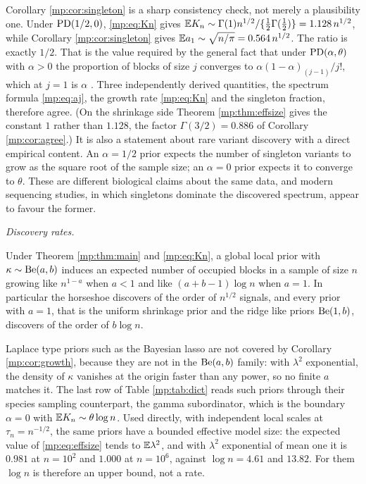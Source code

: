 Corollary \ref{mp:cor:singleton} is a sharp consistency check, not merely a plausibility one.
Under $\mathrm{PD}(1/2,0)$, \eqref{mp:eq:Kn} gives $\mathbb{E} K_n\sim\Gamma(1)n^{1/2}/\{\tfrac12\Gamma(\tfrac12)\}
=1.128\,n^{1/2}$, while Corollary \ref{mp:cor:singleton} gives
$\mathbb{E} a_1\sim\sqrt{n/\pi}=0.564\,n^{1/2}$. The ratio is exactly $1/2$. That is the value
required by the general fact that under $\mathrm{PD}(\alpha,\theta)$ with $\alpha>0$ the proportion of
blocks of size $j$ converges to $\alpha(1-\alpha)_{(j-1)}/j!$, which at $j=1$ is $\alpha$
\citep{mp:pitman2006}. Three independently derived quantities, the spectrum formula
\eqref{mp:eq:aj}, the growth rate \eqref{mp:eq:Kn} and the singleton fraction, therefore agree.
(On the shrinkage side Theorem \ref{mp:thm:effsize} gives the constant $1$ rather than $1.128$,
the factor $\Gamma(3/2)=0.886$ of Corollary \ref{mp:cor:agree}.) It is also a statement about rare variant discovery with a direct
empirical content. An $\alpha=1/2$ prior expects the number of singleton variants to grow
as the square root of the sample size; an $\alpha=0$ prior expects it to converge to
$\theta$. These are different biological claims about the same data, and modern sequencing
studies, in which singletons dominate the discovered spectrum, appear to favour the former.

\medskip
\noindent\emph{Discovery rates.}

\begin{corollary}
\label{mp:cor:growth}
Under Theorem \ref{mp:thm:main} and \eqref{mp:eq:Kn}, a global local prior with
$\kappa\sim\mathrm{Be}(a,b)$ induces an expected number of occupied blocks in a sample of size $n$
growing like $n^{1-a}$ when $a<1$ and like $(a+b-1)\log n$ when $a=1$. In particular the
horseshoe discovers of the order of $n^{1/2}$ signals, and every prior with $a=1$, that is
the uniform shrinkage prior and the ridge like priors $\mathrm{Be}(1,b)$, discovers of the order of
$b\log n$.
\end{corollary}

Laplace type priors such as the Bayesian lasso are not covered by Corollary
\ref{mp:cor:growth}, because they are not in the $\mathrm{Be}(a,b)$ family: with $\lambda^2$
exponential, the density of $\kappa$ vanishes at the origin faster than any power, so no
finite $a$ matches it. The last row of Table \ref{mp:tab:dict} reads such priors through
their species sampling counterpart, the gamma subordinator, which is the boundary
$\alpha=0$ with $\mathbb{E} K_n\sim\theta\log n$. Used directly, with independent local scales at
$\tau_n=n^{-1/2}$, the same priors have a bounded effective model size: the expected value
of \eqref{mp:eq:effsize} tends to $\mathbb{E}\lambda^2$, and with $\lambda^2$ exponential of mean one
it is $0.981$ at $n=10^2$ and $1.000$ at $n=10^6$, against $\log n=4.61$ and $13.82$. For
them $\log n$ is therefore an upper bound, not a rate.

